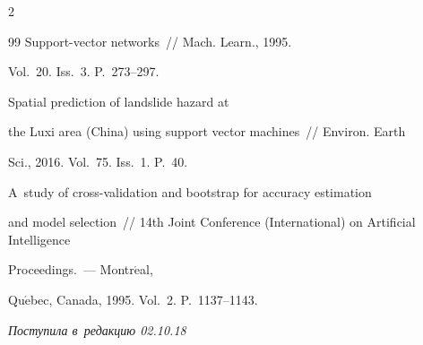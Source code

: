 \begin{multicols}{2}
{{\begin{thebibliography}{99}
 Support-vector networks~// Mach. Learn., 1995. 


Vol.~20. Iss.~3. P.~273--297.




 Spatial prediction of landslide hazard at 


the Luxi area (China) using support vector machines~// Environ. Earth 


Sci., 2016. Vol.~75. Iss.~1. P.~40.




 A~study of cross-validation and bootstrap for accuracy estimation 


and model selection~// 14th Joint Conference (International) on Artificial Intelligence 


Proceedings.~--- Montr$\acute{\mbox{e}}$al, 


Qu$\acute{\mbox{e}}$bec, Canada, 1995. Vol.~2. P.~1137--1143.


 \end{thebibliography}





 }


 }





\end{multicols}





\vspace*{-6pt}





\hfill{\small\textit{Поступила в~редакцию 02.10.18}}















\newpage





\vspace*{-28pt}










